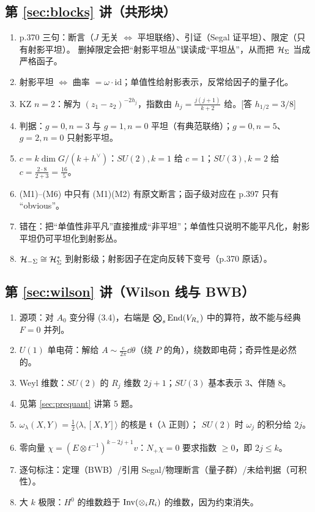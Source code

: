 \subsection*{第 \ref{sec:blocks} 讲（共形块）}
\begin{enumerate}[leftmargin=*]
  \item p.370 三句：断言（$J$ 无关 $\iff$ 平坦联络）、引证（Segal 证平坦）、限定（只有射影平坦）。
        删掉限定会把“射影平坦丛”误读成“平坦丛”，从而把 $\mathcal{H}_\Sigma$ 当成严格函子。
  \item 射影平坦 $\iff$ 曲率 $=\omega\cdot\mathrm{id}$；单值性给射影表示，反常给因子的量子化。
  \item KZ $n=2$：解为 $(z_1-z_2)^{-2h_j}$，指数由 $h_j=\frac{j(j+1)}{k+2}$ 给。\hfill[答 $h_{1/2}=3/8$]
  \item 判据：$g=0,n=3$ 与 $g=1,n=0$ 平坦（有典范联络）；$g=0,n=5$、$g=2,n=0$ 只射影平坦。
  \item $c=k\dim G/(k+h^\vee)$：$SU(2),k=1$ 给 $c=1$；$SU(3),k=2$ 给 $c=\frac{2\cdot8}{2+3}=\frac{16}{5}$。
  \item (M1)--(M6) 中只有 (M1)(M2) 有原文断言；函子级对应在 p.397 只有 “obvious”。
  \item 错在：把“单值性非平凡”直接推成“非平坦”；单值性只说明不能平凡化，射影平坦仍可平坦化到射影丛。
  \item $\mathcal{H}_{-\Sigma}\cong\mathcal{H}_\Sigma^*$ 到射影级；射影因子在定向反转下变号（p.370 原话）。
\end{enumerate}

\subsection*{第 \ref{sec:wilson} 讲（Wilson 线与 BWB）}
\begin{enumerate}[leftmargin=*]
  \item 源项：对 $A_0$ 变分得 (3.4)，右端是 $\bigotimes_s\operatorname{End}(V_{R_s})$ 中的算符，故不能与经典 $F=0$ 并列。
  \item $U(1)$ 单电荷：解给 $A\sim\frac{e}{2\pi}\dd\theta$（绕 $P$ 的角），绕数即电荷；奇异性是必然的。
  \item Weyl 维数：$SU(2)$ 的 $R_j$ 维数 $2j+1$；$SU(3)$ 基本表示 $3$、伴随 $8$。
  \item 见第 \ref{sec:prequant} 讲第 5 题。
  \item $\omega_\lambda(X,Y)=\frac12\langle\lambda,[X,Y]\rangle$ 的核是 $\mathfrak t$（$\lambda$ 正则）；
        $SU(2)$ 时 $\omega_{j}$ 的积分给 $2j$。
  \item 零向量 $\chi=(E\otimes t^{-1})^{k-2j+1}v$：$N_+\chi=0$ 要求指数 $\ge0$，即 $2j\le k$。
  \item 逐句标注：定理（BWB）/引用 Segal/物理断言（量子群）/未给判据（可积性）。
  \item 大 $k$ 极限：$H^0$ 的维数趋于 $\operatorname{Inv}(\otimes_iR_i)$ 的维数，因为约束消失。
\end{enumerate}

